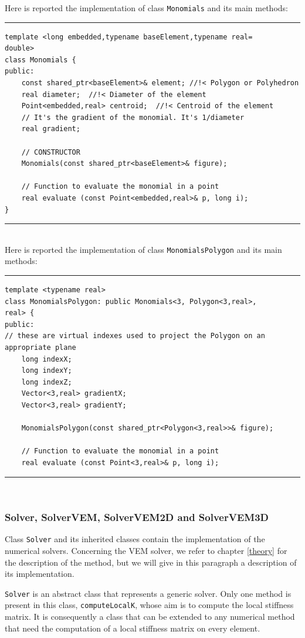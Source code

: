 Here is reported the implementation of class \verb|Monomials| and its main methods:

\noindent\rule{16cm}{1pt}
\begin{lstlisting}[caption=File \texttt{Monomials.h}]
template <long embedded,typename baseElement,typename real=
double>
class Monomials {
public:
    const shared_ptr<baseElement>& element; //!< Polygon or Polyhedron
    real diameter;  //!< Diameter of the element
    Point<embedded,real> centroid;  //!< Centroid of the element
    // It's the gradient of the monomial. It's 1/diameter
    real gradient;

    // CONSTRUCTOR
    Monomials(const shared_ptr<baseElement>& figure);

    // Function to evaluate the monomial in a point
    real evaluate (const Point<embedded,real>& p, long i);
}
\end{lstlisting}
\noindent\rule{16cm}{1pt}\\

Here is reported the implementation of class \verb|MonomialsPolygon| and its main methods:

\noindent\rule{16cm}{1pt}
\begin{lstlisting}[caption=File \texttt{MonomialsPolygon.h}]
template <typename real>
class MonomialsPolygon: public Monomials<3, Polygon<3,real>,
real> {
public:
// these are virtual indexes used to project the Polygon on an appropriate plane
    long indexX;
    long indexY;
    long indexZ;
    Vector<3,real> gradientX;
    Vector<3,real> gradientY;
	
    MonomialsPolygon(const shared_ptr<Polygon<3,real>>& figure); 
    
    // Function to evaluate the monomial in a point
    real evaluate (const Point<3,real>& p, long i);
\end{lstlisting}

\noindent\rule{16cm}{1pt}\\

\subsubsection{Solver, SolverVEM, SolverVEM2D and SolverVEM3D}
Class \verb|Solver| and its inherited classes contain the implementation of the numerical solvers. Concerning the VEM solver, we refer to chapter \ref{theory} for the description of the method, but we will give in this paragraph a description of its implementation. 

\verb|Solver| is an abstract class that represents a generic solver. Only one method is present in this class, \verb|computeLocalK|, whose aim is to compute the local stiffness matrix. It is consequently a class that can be extended to any numerical method that need the computation of a local stiffness matrix on every element. 

